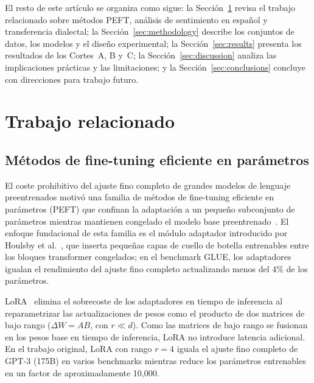 \documentclass[conference]{IEEEtran}
\begin{document}
El resto de este artículo se organiza como sigue:
la Sección~\ref{sec:related_work} revisa el trabajo relacionado sobre métodos
PEFT, análisis de sentimiento en español y transferencia dialectal;
la Sección~\ref{sec:methodology} describe los conjuntos de datos, los modelos y
el diseño experimental;
la Sección~\ref{sec:results} presenta los resultados de los Cortes~A, B y~C;
la Sección~\ref{sec:discussion} analiza las implicaciones prácticas y las
limitaciones; y la Sección~\ref{sec:conclusions} concluye con direcciones para
trabajo futuro.


\section{Trabajo relacionado}
\label{sec:related_work}

\subsection{Métodos de fine-tuning eficiente en parámetros}
\label{sec:related_peft}

El coste prohibitivo del ajuste fino completo de grandes modelos de lenguaje
preentrenados motivó una familia de métodos de fine-tuning eficiente en
parámetros (PEFT) que confinan la adaptación a un pequeño subconjunto de
parámetros mientras mantienen congelado el modelo base
preentrenado~\cite{ding2023peftsurvey}.
El enfoque fundacional de esta familia es el módulo adaptador introducido por
Houlsby et al.~\cite{houlsby2019adapters}, que inserta pequeñas capas de cuello
de botella entrenables entre los bloques transformer congelados; en el benchmark
GLUE, los adaptadores igualan el rendimiento del ajuste fino completo
actualizando menos del 4\% de los parámetros.

LoRA~\cite{hu2021lora} elimina el sobrecoste de los adaptadores en tiempo de
inferencia al reparametrizar las actualizaciones de pesos como el producto de
dos matrices de bajo rango ($\Delta W = AB$, con $r \ll d$).
Como las matrices de bajo rango se fusionan en los pesos base en tiempo de
inferencia, LoRA no introduce latencia adicional.
En el trabajo original, LoRA con rango $r=4$ iguala el ajuste fino completo de
GPT-3 (175B) en varios benchmarks mientras reduce los parámetros entrenables en
un factor de aproximadamente 10,000.
\end{document}
